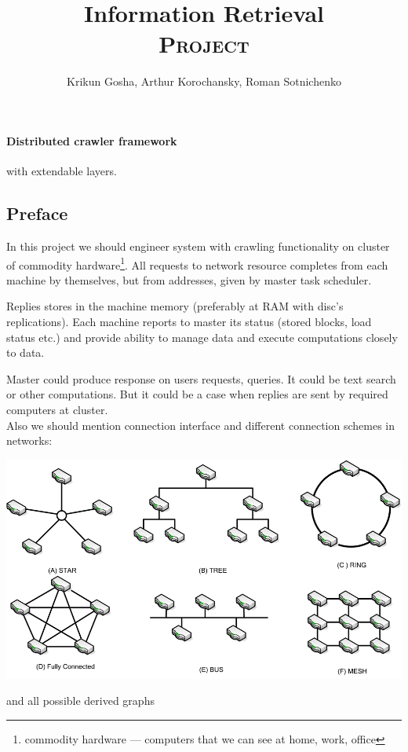 \documentclass[9pt]{extarticle}
\title{Information Retrieval \\ \textsc{Project}}
\author{Krikun Gosha, Arthur Korochansky, Roman Sotnichenko}
\date{}
\begin{document}
\maketitle
\paragraph*{Distributed crawler framework} with extendable layers.\\

\subsection*{Preface}
\begin{multicols}{2}
In this project we should engineer system with crawling functionality on cluster
of commodity hardware\footnote{commodity hardware --- computers that we can see at
home, work, office}. All requests to network resource completes from each
machine by themselves, but from addresses, given by master task scheduler.

Replies stores in the machine memory (preferably at RAM with disc's
replications). Each machine reports to master its status (stored blocks, load
status etc.) and provide ability to manage data and execute computations closely
to data. 

Master could produce response on users requests, queries. It could be text
search or other computations. But it could be a case when replies are sent by
required computers at cluster.\\

Also we should mention connection interface and different connection schemes in
networks:\\

\begin{center}
\includegraphics[width=0.9\linewidth]{connections}

{\footnotesize                  
and all possible derived graphs 
}
\vfill


\end{center}
\end{multicols}
\end{document}
